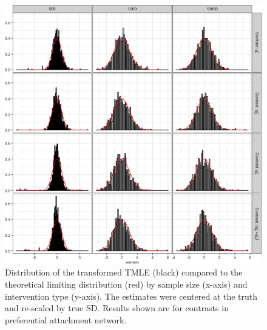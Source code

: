 \documentclass[english]{article}\usepackage[]{graphicx}\usepackage[]{color}
\makeatletter
\def\maxwidth{ %
  \ifdim\Gin@nat@width>\linewidth
    \linewidth
  \else
    \Gin@nat@width
  \fi
}
\newenvironment{knitrout}{}{} %
\theoremstyle{plain}
\theoremstyle{plain}
\makeatother
\begin{document}
\begin{knitrout}\footnotesize
{}\color{fgcolor}\begin{figure}

{\centering \includegraphics[width=\maxwidth]{TablesFigs/knitR-hist_TMLE_ATE_prefattach-1} 

}

\caption[Distribution of the transformed TMLE (black) compared to the theoretical limiting distribution (red) by sample size (x-axis) and intervention type (y-axis)]{Distribution of the transformed TMLE (black) compared to the theoretical limiting distribution (red) by sample size (x-axis) and intervention type (y-axis). The estimates were centered at the truth and re-scaled by true SD. Results shown are for contrasts in preferential attachment network.}\label{fig:hist.TMLE.ATE.prefattach}
\end{figure}


\end{knitrout}
\end{document}
